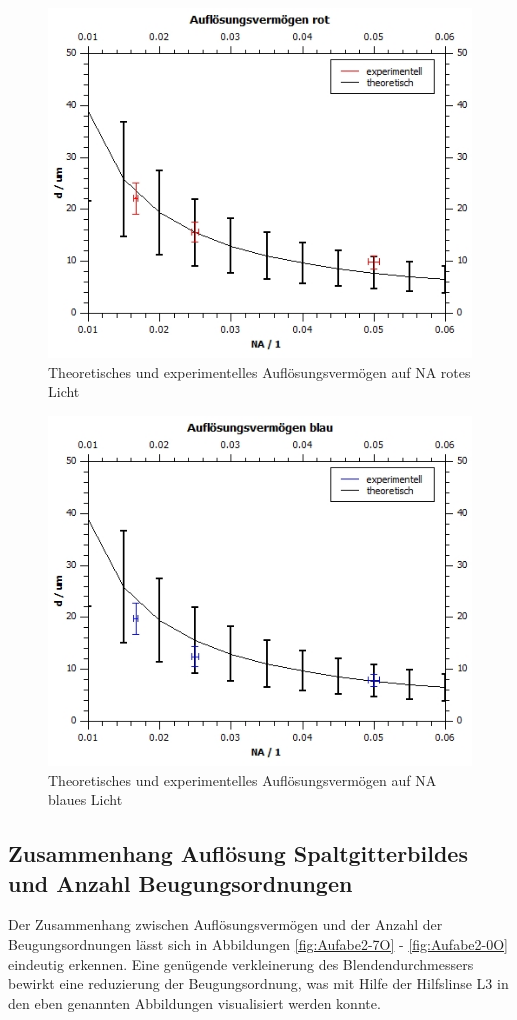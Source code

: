 \documentclass[12pt,a4paper,twoside]{article}
\begin{document}
\begin{figure}[H]
    \centering
    \includegraphics[width=0.6\linewidth]{nudes/AuflösungsvermögenPlotRot.jpg}
    \caption{Theoretisches und experimentelles Auflösungsvermögen auf NA rotes Licht}
    \label{fig:AuflösungsvermögenPlotRot}
\end{figure}

\begin{figure}[H]
    \centering
    \includegraphics[width=0.6\linewidth]{nudes/AuflösungsvermögenPlotBlau.jpg}
    \caption{Theoretisches und experimentelles Auflösungsvermögen auf NA blaues Licht}
    \label{fig:AuflösungsvermögenPlotBlau}
\end{figure}


\subsection{Zusammenhang Auflösung Spaltgitterbildes und Anzahl Beugungsordnungen}

Der Zusammenhang zwischen Auflösungsvermögen und der Anzahl der Beugungsordnungen lässt sich in Abbildungen \ref{fig:Aufabe2-7O} - \ref{fig:Aufabe2-0O} eindeutig erkennen.
Eine genügende verkleinerung des Blendendurchmessers bewirkt eine reduzierung der Beugungsordnung, was mit Hilfe der Hilfslinse L3 in den eben genannten Abbildungen visualisiert werden konnte.
\end{document}
